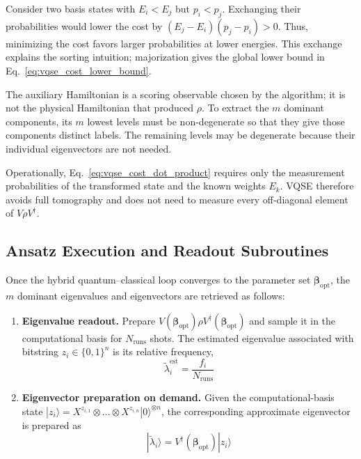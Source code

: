 \begin{remark}
    Consider two basis states with $E_i<E_j$ but $p_i<p_j$. Exchanging their probabilities would lower the cost by $(E_j-E_i)(p_j-p_i)>0$. Thus, minimizing the cost favors larger probabilities at lower energies. This exchange explains the sorting intuition; majorization gives the global lower bound in Eq.~\eqref{eq:vqse_cost_lower_bound}.
\end{remark}

\begin{remark}
    The auxiliary Hamiltonian is a scoring observable chosen by the algorithm; it is not the physical Hamiltonian that produced $\rho$. To extract the $m$ dominant components, its $m$ lowest levels must be non-degenerate so that they give those components distinct labels. The remaining levels may be degenerate because their individual eigenvectors are not needed.
\end{remark}

Operationally, Eq.~\eqref{eq:vqse_cost_dot_product} requires only the measurement probabilities of the transformed state and the known weights $E_k$. VQSE therefore avoids full tomography and does not need to measure every off-diagonal element of $V\rho V^\dagger$.

\subsection{Ansatz Execution and Readout Subroutines}

Once the hybrid quantum--classical loop converges to the parameter set $\boldsymbol{\beta}_{\text{opt}}$, the $m$ dominant eigenvalues and eigenvectors are retrieved as follows:
\begin{enumerate}
    \item \textbf{Eigenvalue readout.} Prepare $V(\boldsymbol{\beta}_{\text{opt}})\rho V^\dagger(\boldsymbol{\beta}_{\text{opt}})$ and sample it in the computational basis for $N_{\text{runs}}$ shots. The estimated eigenvalue associated with bitstring $z_i\in\{0,1\}^n$ is its relative frequency,
          \begin{equation}
              \tilde{\lambda}_i^{\mathrm{est}}=\frac{f_i}{N_{\text{runs}}}
          \end{equation}
    \item \textbf{Eigenvector preparation on demand.} Given the computational-basis state $|z_i\rangle=X^{z_{i,1}}\otimes\dots\otimes X^{z_{i,n}}|0\rangle^{\otimes n}$, the corresponding approximate eigenvector is prepared as
          \begin{equation}
              |\tilde{\lambda}_i\rangle=V^\dagger(\boldsymbol{\beta}_{\text{opt}})|z_i\rangle
          \end{equation}
\end{enumerate}

